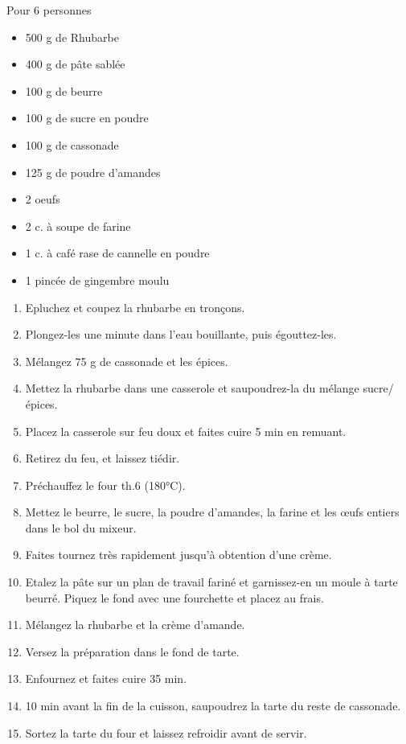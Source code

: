 \medskip
\phantom{.}

\bigskip
\label{TarteRhubarbe}
{Pour 6 personnes}{\begin{itemize}
	\item 500 g de Rhubarbe 
	\item 400 g de pâte sablée
	\item 100 g de beurre
	\item 100 g de sucre en poudre
	\item 100 g de cassonade
	\item 125 g de poudre d'amandes
	\item 2 oeufs
	\item 2 c. à soupe de farine
	\item 1 c. à café rase de cannelle en poudre
	\item 1 pincée de gingembre moulu
\end{itemize}}
{\begin{enumerate}
	\item Epluchez et coupez la rhubarbe en tronçons.
	\item Plongez-les une minute dans l’eau bouillante, puis égouttez-les.
	\item Mélangez 75 g de cassonade et les épices.
	\item Mettez la rhubarbe dans une casserole et saupoudrez-la du mélange sucre/épices.
	\item Placez la casserole sur feu doux et faites cuire 5 min en remuant.
	\item Retirez du feu, et laissez tiédir.
	\item Préchauffez le four th.6 (180°C).
	\item Mettez le beurre, le sucre, la poudre d’amandes, la farine et les œufs entiers dans le bol du mixeur.
	\item Faites tournez très rapidement jusqu’à obtention d’une crème.
	\item Etalez la pâte sur un plan de travail fariné et garnissez-en un moule à tarte beurré. Piquez le fond avec une fourchette et placez au frais.
	\item Mélangez la rhubarbe et la crème d’amande.
	\item Versez la préparation dans le fond de tarte.
	\item Enfournez et faites cuire 35 min.
	\item 10 min avant la fin de la cuisson, saupoudrez la tarte du reste de cassonade.
	\item Sortez la tarte du four et laissez refroidir avant de servir.
\end{enumerate}}

